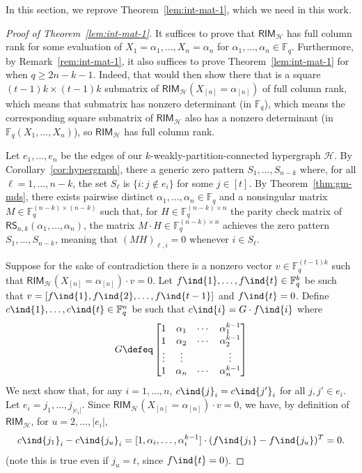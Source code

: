 \documentclass{article}[11pt]
\def\RS{\mathsf{RS}}
\begin{document}
In this section, we reprove Theorem~\ref{lem:int-mat-1}, which we need in this work.

\begin{proof}[Proof of Theorem~\ref{lem:int-mat-1}]
  It suffices to prove that $\mathsf{RIM}_\mathcal{H}$ has full column rank for some evaluation of $X_1=\alpha_1,\dots,X_n=\alpha_n$ for $\alpha_1,\dots,\alpha_n\in\mathbb{F}_q$.
  Furthermore, by Remark~\ref{rem:int-mat-1}, it also suffices to prove Theorem~\ref{lem:int-mat-1} for when $q \ge 2n-k-1$.
  Indeed, that would then show there that is a square $(t-1)k\times (t-1)k$ submatrix of $\mathsf{RIM}_{\mathcal{H}}(X_{[n]}=\alpha_{[n]})$ of full column rank, which means that submatrix has nonzero determinant (in $\mathbb{F}_q$), which means the corresponding square submatrix of $\mathsf{RIM}_{\mathcal{H}}$ also has a nonzero determinant (in $\mathbb{F}_q(X_1,\dots,X_n)$), so $\mathsf{RIM}_{\mathcal{H}}$ has full column rank.
  
Let $e_1,\dots,e_n$ be the edges of our $k$-weakly-partition-connected hypergraph $\mathcal{H}$.
By Corollary~\ref{cor:hypergraph}, there a generic zero pattern $S_1,\dots,S_{n-k}$ where, for all $\ell=1,\dots,n-k$, the set $S_\ell$ is $\{i:j\notin e_i\}$ for some $j\in[t]$.
By Theorem~\ref{thm:gm-mds}, there exists pairwise distinct $\alpha_1,\dots,\alpha_n \in \mathbb{F}_q$ and a nonsingular matrix $M\in \mathbb{F}_q^{(n-k)\times (n-k)}$ such that, for $H\in\mathbb{F}_q^{(n-k)\times n}$ the parity check matrix of $\RS_{n,k}(\alpha_1,\dots,\alpha_n)$, the matrix $M\cdot H\in\mathbb{F}_q^{(n-k)\times n}$ achieves the zero pattern $S_1,\dots,S_{n-k}$,  meaning that $(MH)_{\ell,i}=0$ whenever $i\in S_\ell$.

  Suppose for the sake of contradiction there is a nonzero vector $v\in \mathbb{F}_q^{(t-1)k}$ such that $\mathsf{RIM}_{\mathcal{H}}(X_{[n]}=\alpha_{[n]}) \cdot v = 0$. Let $f\ind{1},\dots,f\ind{t}\in\mathbb{F}_q^{k}$ be such that $v=[f\ind{1},f\ind{2},\dots,f\ind{t-1}]$ and $f\ind{t}=0$.
  Define $c\ind{1},\dots,c\ind{t}\in\mathbb{F}_q^n$ be such that $c\ind{i} = G\cdot f\ind{i}$ where
  \begin{align}
    G\defeq
    \begin{bmatrix}
      1 & \alpha_1 & \cdots & \alpha_1^{k-1} \\
      1 & \alpha_2 & \cdots & \alpha_2^{k-1} \\
      \vdots &\vdots&&\vdots \\
      1 & \alpha_n & \cdots & \alpha_n^{k-1} \\
    \end{bmatrix}
    \label{}
  \end{align}
  We next show that, for any $i=1,\dots,n$, $c\ind{j}_i = c\ind{j'}_i$ for all $j,j'\in e_i$.
Let $e_i = j_1,\dots,j_{|e_i|}$.
Since $\mathsf{RIM}_{\mathcal{H}}(X_{[n]}=\alpha_{[n]}) \cdot v = 0$, we have, by definition of $\mathsf{RIM}_\mathcal{H}$, for $u=2,\dots,|e_i|$,
\begin{align}
  c\ind{j_1}_i-c\ind{j_u}_i = [1,\alpha_i,\dots,\alpha_i^{k-1}] \cdot (f\ind{j_1} - f\ind{j_u})^T = 0.
  \label{}
\end{align}
(note this is true even if $j_u = t$, since $f\ind{t}=0$).


\end{proof}
\end{document}
